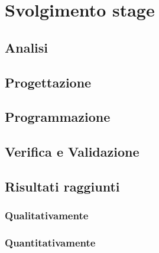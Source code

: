 \chapter{Svolgimento stage}
\label{cap:svolgimentoStage}

\section{Analisi}
%

\section{Progettazione}
%

\section{Programmazione}
%

\section{Verifica e Validazione}
%

\section{Risultati raggiunti}
\subsection{Qualitativamente}
%

\subsection{Quantitativamente}
%
